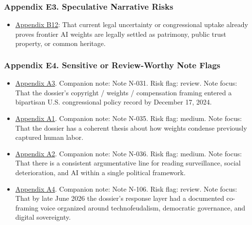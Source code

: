 \documentclass[
  american,
  11pt,
  letterpaper,
]{article}
\providecommand{\tightlist}{%
  \setlength{\itemsep}{0pt}\setlength{\parskip}{0pt}}
\begin{document}
\subsubsection{Appendix E3. Speculative Narrative
Risks}\label{appendix-e3-speculative-narrative-risks}

\begin{itemize}
\tightlist
\item
  \hyperref[appendix-b12-current-legal-uncertainty-or-congressional-uptake-already-proves-frontier-ai-weig]{Appendix
  B12}: That current legal uncertainty or congressional uptake already
  proves frontier AI weights are legally settled as patrimony, public
  trust property, or common heritage.
\end{itemize}

\subsubsection{Appendix E4. Sensitive or Review-Worthy Note
Flags}\label{appendix-e4-sensitive-or-review-worthy-note-flags}

\begin{itemize}
\tightlist
\item
  \hyperref[appendix-a3-bipartisan-house-task-force-report-on-artificial-intelligence]{Appendix
  A3}. Companion note: Note N-031. Risk flag: review. Note focus: That
  the dossier's copyright / weights / compensation framing entered a
  bipartisan U.S. congressional policy record by December 17, 2024.
\item
  \hyperref[appendix-a1-ai-copyright-weights-a-new-frontier-in-intellectual-property-law]{Appendix
  A1}. Companion note: Note N-035. Risk flag: medium. Note focus: That
  the dossier has a coherent thesis about how weights condense
  previously captured human labor.
\item
  \hyperref[appendix-a2-how-ai-is-ruining-your-life-to-build-an-empire]{Appendix
  A2}. Companion note: Note N-036. Risk flag: medium. Note focus: That
  there is a consistent argumentative line for reading surveillance,
  social deterioration, and AI within a single political framework.
\item
  \hyperref[appendix-a4-c-mo-hackear-al-tecnofeudalismo]{Appendix A4}.
  Companion note: Note N-106. Risk flag: review. Note focus: That by
  late June 2026 the dossier's response layer had a documented
  co-framing voice organized around technofeudalism, democratic
  governance, and digital sovereignty.
\end{itemize}
\end{document}
